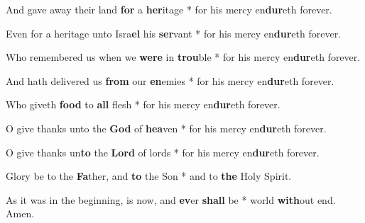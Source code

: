 \begin{multicols}{2}
	And gave away their land \textbf{for} a \textbf{her}itage * for his mercy en\textbf{dur}eth forever.
	
	Even for a heritage unto Isra\textbf{el} his \textbf{ser}vant * for his mercy en\textbf{dur}eth forever.
	
	Who remembered us when we \textbf{were} in \textbf{trou}ble * for his mercy en\textbf{dur}eth forever.
	
	And hath delivered us \textbf{from} our \textbf{en}emies * for his mercy en\textbf{dur}eth forever.
	
	Who giveth \textbf{food} to \textbf{all} flesh * for his mercy en\textbf{dur}eth forever.
	
	O give thanks unto the \textbf{God} of \textbf{hea}ven * for his mercy en\textbf{dur}eth forever.
	
	O give thanks un\textbf{to} the \textbf{Lord} of lords * for his mercy en\textbf{dur}eth forever.
	
	Glory be to the \textbf{Fa}ther, and \textbf{to} the Son * and to \textbf{the} Holy Spirit.
	
	As it was in the beginning, is now, and \textbf{ev}er \textbf{shall} be * world \textbf{with}out end. Amen.
\end{multicols}
